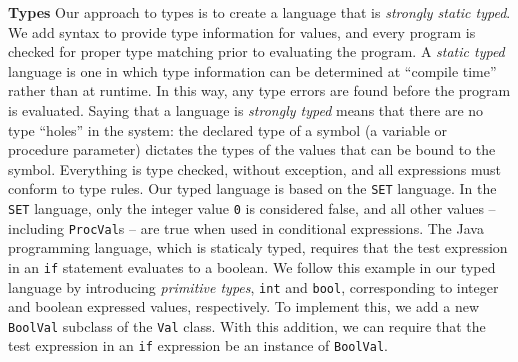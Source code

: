 \begin{minipage}[t]{\sw}
\slidenumber
\LARGE
{\bf Types}\exx
Our approach to types is to create a language that is
{\em strongly static typed}.
We add syntax to provide type information for values,
and every program is checked
for proper type matching prior
to evaluating the program.\exx
A {\em static typed} language is one in which type information 
can be determined at ``compile time'' rather than at runtime.
In this way, any type errors are found
before the program is evaluated.
Saying that a language is {\em strongly typed}
means that there are no type ``holes'' in the system:
the declared type of a symbol
(a variable or procedure parameter)
dictates the types of the values that can be bound to the symbol.
Everything is type checked, without exception,
and all expressions must conform to type rules.\exx
Our typed language is based on the \verb'SET' language.
In the \verb'SET' language,
only the integer value \verb'0' is considered false,
and all other values -- including \verb'ProcVal's -- are true
when used in conditional expressions.
The Java programming language, which is staticaly typed,
requires that the test expression
in an \verb'if' statement evaluates to a boolean.
We follow this example in our typed language
by introducing {\em primitive types}, \verb'int' and \verb'bool',
corresponding to integer and boolean expressed values, respectively.
To implement this, we add a new \verb'BoolVal' subclass
of the \verb'Val' class.
With this addition, we can require that the test expression
in an \verb'if' expression be an instance of \verb'BoolVal'.\exx
\end{minipage}
